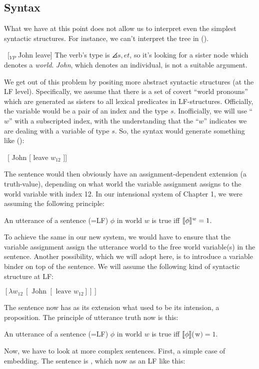 \subsection{Syntax}

What we have at this point does not allow us to interpret even the simplest syntactic structures. For instance, we can't interpret the tree in (\nextx).

\ex\ [$_{VP}$ John leave] \xe
%
The verb's type is $\angles{s,et}$, so it's looking for a sister node which denotes a \emph{world}. \emph{John}, which denotes an individual, is not a suitable argument.

We get out of this problem by positing more abstract syntactic structures (at the LF level). Specifically, we assume that there is a set of covert ``world pronouns'' which are generated as sisters to all lexical predicates in LF-structures. Officially, the variable would be a pair of an index and the type $s$. Inofficially, we will use ``$w$'' with a subscripted index, with the understanding that the ``$w$'' indicates we are dealing with a variable of type $s$. So, the syntax would generate something like (\nextx):

\ex\ [ John [ leave $w_{12}$ ]] \xe

The sentence would then obviously have an assignment-dependent extension (a truth-value), depending on what world the variable assignment assigns to the world variable with index 12. In our intensional system of Chapter 1, we were assuming the following principle:

\ex An utterance of a sentence (=LF) $\phi$ in world $w$ is true iff $\llbracket \phi \rrbracket^w = 1$. \xe

To achieve the same in our new system, we would have to ensure that the variable assignment assign the utterance world to the free world variable(s) in the sentence. Another possibility, which we will adopt here, is to introduce a variable binder on top of the sentence. We will assume the following kind of syntactic structure at LF:

\ex $[ \lambda w_{12}\ [ \mbox{ John } [ \mbox{ leave } w_{12} ]]]$ \xe

The sentence now has as its extension what used to be its intension, a proposition. The principle of utterance truth now is this:

\ex An utterance of a sentence (=LF) $\phi$ in world $w$ is true iff $\llbracket \phi \rrbracket($w$) = 1$. \xe

Now, we have to look at more complex sentences. First, a simple case of embedding. The sentence is , which now as an LF like this:

